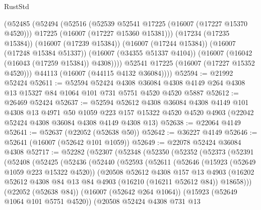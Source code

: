\begin{lexlean}{RustStd}
\begin{coremodule}
          (@52485
            (@52494
              (@52516
                (@52539 @52541 @17225 (@16007 (@17227 @15370 @4520)))
                @17225
                (@16007 (@17227 @15360 @15381)))
              (@17234 (@17235 @15384))
              (@16007 (@17239 @15384))
              (@16007 (@17244 @15384))
              (@16007 (@17248 @15384 @51337))
              (@16007 (@34355 @51337 @4104))
              (@16007 (@16042 (@16043 (@17259 @15384)) @4308))))
          @52541
          @17225
          (@16007 (@17227 @15352 @4520)))
        @44113
        (@16007 (@44115 @4132 @36084))))
@52594 := @21992 @52424
@52611 := @52594
    @52424
    @4308
    @36084
    @4308
    @4149
    @264
    @4308
    @13
    @15327
    @84
    @1064
    @101
    @731
    @5751
    @4520
    @4520
    @5887
@52612 := @26469 @52424
@52637 := @52594
    @52612
    @4308
    @36084
    @4308
    @4149
    @101
    @4308
    @13
    @4971
    @50
    @1059
    @223
    @157
    @15322
    @4520
    @4520
    @4903
    (@22042 @52424 @4308 @36084 @4308 @4149 @4308 @13)
@52638 := @22064 @4149
@52641 := @52637 (@22052 (@52638 @50))
@52642 := @36227 @4149
@52646 := @52641 (@16007 (@52642 @101 @1059))
@52649 := @22078 @52424 @36084 @4308
@52717 := @52282
    (@52307
      (@52348
        (@52350
          (@52352
            (@52373
              (@52391
                (@52408
                  (@52425
                    (@52436
                      (@52440
                        (@52593
                          (@52611
                            (@52646
                              (@15923 (@52649 @1059 @223 @15322 @4520))
                              (@20508
                                @52612
                                @4308
                                @157
                                @13
                                @4903
                                (@16202
                                  @52612
                                  @4308
                                  @84
                                  @13
                                  @84
                                  @4903
                                  (@16210 (@16211 @52612 @84))
                                  @18658)))
                            (@22052 (@52638 @84))
                            (@16007 (@52642 @264 @1064))
                            (@15923 (@52649 @1064 @101 @5751 @4520))
                            (@20508
                              @52424
                              @4308
                              @731
                              @13

\end{coremodule}
\end{lexlean}
